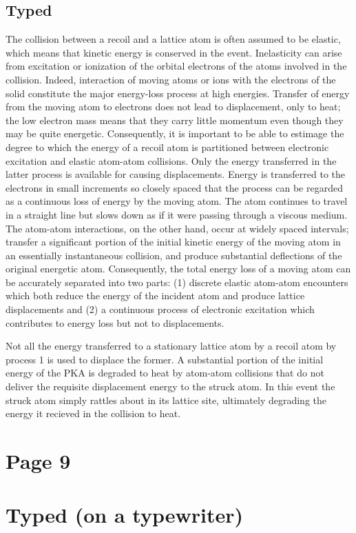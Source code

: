 \documentclass[11pt]{article}
\begin{document}
\subsection{Typed}
The collision between a recoil and a lattice atom is often assumed to be elastic, which means that kinetic energy is conserved in the event. Inelasticity can arise from excitation or ionization of the orbital electrons of the atoms involved in the collision. Indeed, interaction of moving atoms or ions with the electrons of the solid constitute the major energy-loss process at high energies. Transfer of energy from the moving atom to electrons does not lead to displacement, only to heat; the low electron mass means that they carry little momentum even though they may be quite energetic. Consequently, it is important to be able to estimage the degree to which the energy of a recoil atom is partitioned between electronic excitation and elastic atom-atom collisions. Only the energy transferred in the latter process is available for causing displacements. Energy is transferred to the electrons in small increments so closely spaced that the process can be regarded as a continuous loss of energy by the moving atom. The atom continues to travel in a straight line but slows down as if it were passing through a viscous medium. The atom-atom interactions, on the other hand, occur at widely spaced intervals; transfer a significant portion of the initial kinetic energy of the moving atom in an essentially instantaneous collision, and produce substantial deflections of the original energetic atom. Consequently, the total energy loss of a moving atom can be accurately separated into two parts: (1) discrete elastic atom-atom encounters which both reduce the energy of the incident atom and produce lattice displacements and (2) a continuous process of electronic excitation which contributes to energy loss but not to displacements.

Not all the energy transferred to a stationary lattice atom by a recoil atom by process 1 is used to displace the former. A substantial portion of the initial energy of the PKA is degraded to heat by atom-atom collisions that do not deliver the requisite displacement energy to the struck atom. In this event the struck atom simply rattles about in its lattice site, ultimately degrading the energy it recieved in the collision to heat.

\section{Page 9}

\section{Typed (on a typewriter)}
\end{document}
